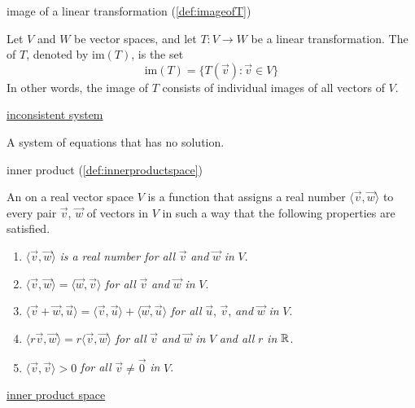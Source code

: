\documentclass{ximera}
\begin{document}
image of a linear transformation (\ref{def:imageofT})
\begin{expandable}
    Let $V$ and $W$ be vector spaces, and let $T:V\rightarrow W$ be a linear transformation.  The  of $T$, denoted by $\mbox{im}(T)$, is the set
$$\mbox{im}(T)=\{T(\vec{v}):\vec{v}\in V\}$$
In other words, the image of $T$ consists of individual images of all vectors of $V$.
\end{expandable}

\href{https://ximera.osu.edu/oerlinalg/LinearAlgebra/SYS-0010/main}{inconsistent system}
\begin{expandable}
    A system of equations that has no solution.
\end{expandable}

inner product (\ref{def:innerproductspace})
\begin{expandable}
    An  on a real vector space $V$ is a function that assigns a real number $\langle\vec{v}, \vec{w}\rangle$ to every pair $\vec{v}$, $\vec{w}$ of vectors in $V$ in such a way that the following properties are satisfied.

\begin{enumerate}
\item  $\langle\vec{v}, \vec{w}\rangle$ \textit{is a real number for all} $\vec{v}$ \textit{and} $\vec{w}$ \textit{in} $V$.

\item  $\langle\vec{v}, \vec{w}\rangle = \langle\vec{w}, \vec{v}\rangle$ \textit{for all} $\vec{v}$ \textit{and} $\vec{w}$ \textit{in} $V$.

\item  $\langle\vec{v} + \vec{w}, \vec{u}\rangle = \langle\vec{v}, \vec{u}\rangle + \langle\vec{w}, \vec{u}\rangle$ \textit{for all} $\vec{u}$, $\vec{v}$, \textit{and} $\vec{w}$ \textit{in} $V$.

\item $\langle r\vec{v}, \vec{w}\rangle = r\langle\vec{v}, \vec{w}\rangle$ \textit{for all} $\vec{v}$ \textit{and} $\vec{w}$ \textit{in} $V$ \textit{and all} $r$ \textit{in} $\mathbb{R}$.

\item  $\langle\vec{v}, \vec{v}\rangle > 0$ \textit{for all} $\vec{v} \neq \vec{0}$ \textit{in} $V$.

\end{enumerate}
\end{expandable}

\href{https://ximera.osu.edu/oerlinalg/LinearAlgebra/VSP-0070/main}{inner product space}
\end{document}
